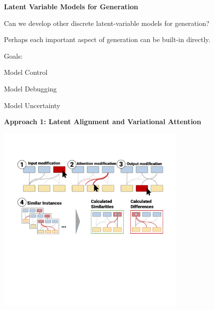 \documentclass[aspectratio=169]{beamer}
\let\tempone\itemize
\let\temptwo\enditemize
\renewenvironment{itemize}{\tempone\addtolength{\itemsep}{0.5\baselineskip}}{\temptwo}
\newcommand{\air}{\vspace{0.25cm}}
\begin{document}
\begin{frame}
  \begin{center}
    \textbf{ Latent Variable Models for Generation}
  \end{center}
  
  \begin{itemize}
  \item Can we develop other discrete latent-variable models for generation?
    \air
  \item Perhaps each important aspect of generation can be built-in directly.
    \air
  \item Goals:
    \begin{itemize}
    \item Model Control 
    \item Model Debugging
    \item Model Uncertainty
    \end{itemize}
  \end{itemize}
\end{frame}



\begin{frame}
  \begin{center}
    \textbf{Approach 1: Latent Alignment and Variational Attention}
  \end{center}
  
  \begin{center}
    \includegraphics[width=0.7\textwidth]{AttentionVIS}
  \end{center}
\end{frame}
\end{document}
